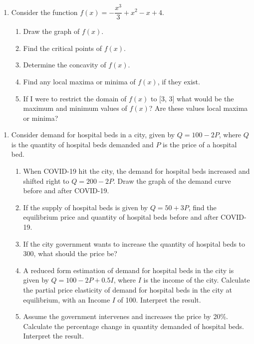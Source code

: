 \documentclass{article}
\begin{document}
\begin{enumerate}[resume]
    \item Consider the function $f(x) = - \dfrac{x^3}{3} + x^2 - x +4$.
    \begin{enumerate}
        \item Draw the graph of $f(x)$.
        \item Find the critical points of $f(x)$.
        \item Determine the concavity of $f(x)$.
        \item Find any local maxima or minima of $f(x)$, if they exist.
        \item If I were to restrict the domain of $f(x)$ to [3, 3] what would be the maximum and minimum values of $f(x)$? Are these values local maxima or minima?
    \end{enumerate}
\end{enumerate}

\begin{enumerate}[resume]
    \item Consider demand for hospital beds in a city, given by $Q = 100 - 2P$, where $Q$ is the quantity of hospital beds demanded and $P$ is the price of a hospital bed. 
    \begin{enumerate}
        \item When COVID-19 hit the city, the demand for hospital beds increased and shifted right to $Q = 200 - 2P$. Draw the graph of the demand curve before and after COVID-19.
        \item If the supply of hospital beds is given by $Q = 50 + 3P$, find the equilibrium price and quantity of hospital beds before and after COVID-19. 
        \item If the city government wants to increase the quantity of hospital beds to 300, what should the price be?
        \item A reduced form estimation of demand for hospital beds in the city is given by $Q = 100 - 2P + 0.5I$, where $I$ is the income of the city. Calculate the partial price elasticity of demand for hospital beds in the city at equilibrium, with an Income $I$ of 100. Interpret the result.
        \item Assume the government intervenes and increases the price by 20\%. Calculate the percentage change in quantity demanded of hospital beds. Interpret the result. 
    \end{enumerate}
\end{enumerate}
\end{document}
